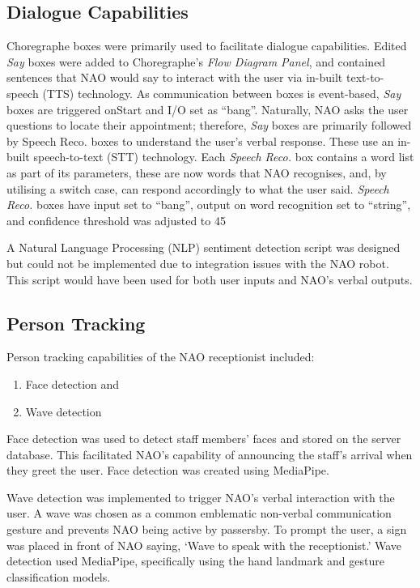 \documentclass[conference]{IEEEtran}
\begin{document}
\subsection{Dialogue Capabilities} Choregraphe boxes were primarily used to facilitate dialogue capabilities. Edited \textit{Say} boxes were added to Choregraphe’s \textit{Flow Diagram Panel}, and contained sentences that NAO would say to interact with the user via in-built text-to-speech (TTS) technology. As communication between boxes is event-based, \textit{Say} boxes are triggered onStart and I/O set as “bang”. Naturally, NAO asks the user questions to locate their appointment; therefore, \textit{Say} boxes are primarily followed by Speech Reco. boxes to understand the user’s verbal response. These use an in-built speech-to-text (STT) technology. Each \textit{Speech Reco.} box contains a word list as part of its parameters, these are now words that NAO recognises, and, by utilising a switch case, can respond accordingly to what the user said. \textit{Speech Reco.} boxes have input set to “bang”, output on word recognition set to “string”, and confidence threshold was adjusted to 45%

A Natural Language Processing (NLP) sentiment detection script was designed but could not be implemented due to integration issues with the NAO robot. This script would have been used for both user inputs and NAO’s verbal outputs. 

\subsection{Person Tracking}
Person tracking capabilities of the NAO receptionist included:
\begin{enumerate}
        \item Face detection and
        \item Wave detection
\end{enumerate}

Face detection was used to detect staff members’ faces and stored on the server database. This facilitated NAO’s capability of announcing the staff’s arrival when they greet the user. Face detection was created using MediaPipe.

Wave detection was implemented to trigger NAO’s verbal interaction with the user. A wave was chosen as a common emblematic non-verbal communication gesture and prevents NAO being active by passersby.  To prompt the user, a sign was placed in front of NAO saying, ‘Wave to speak with the receptionist.’ Wave detection used MediaPipe, specifically using the hand landmark and gesture classification models. 
\end{document}
